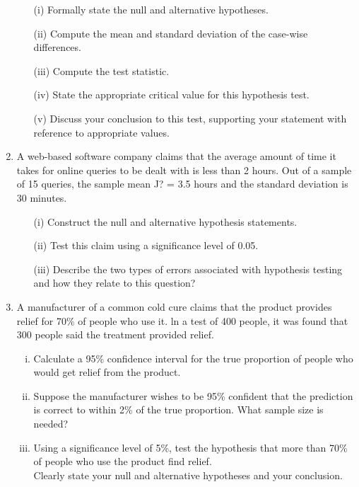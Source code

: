 \documentclass[]{article}
\begin{document}
\begin{enumerate}


\begin{itemize}
	\item[(i)] Formally state the null and alternative hypotheses.
	\item[(ii)]  Compute the mean and standard deviation of the case-wise differences.
	\item[(iii)] Compute the test statistic.
	\item[(iv)] State the appropriate critical value for this hypothesis test.
	\item[(v)] Discuss your conclusion to this test, supporting your statement with reference to appropriate values.
\end{itemize}




\item 
A web-based software company claims that the average amount of time it takes for
online queries to be dealt with is less than 2 hours. Out of a sample of 15 queries, the
sample mean J? = 3.5 hours and the standard deviation is 30 minutes.
\begin{itemize}
	\item[(i)] Construct the null and alternative hypothesis statements.
	\item[(ii)] Test this claim using a significance level of 0.05.
	\item[(iii)] Describe the two types of errors associated with hypothesis testing and how
	they relate to this question?
\end{itemize}


\item 
A manufacturer of a common cold cure claims that the product provides
relief for 70\% of people who use it. ln a test of 400 people, it was found
that 300 people said the treatment provided relief.

\begin{enumerate}[(i)]
	\item Calculate a 95\% confidence interval for the true proportion of
	people who would get relief from the product.
	
	\item Suppose the manufacturer wishes to be 95\% confident that the
	prediction is correct to within 2\% of the true proportion. What
	sample size is needed?
	
	\item Using a significance level of 5\%, test the hypothesis that more than
	70\% of people who use the product find relief.\\ Clearly state your
	null and alternative hypotheses and your conclusion.
\end{enumerate}


\end{enumerate}
\end{document}
